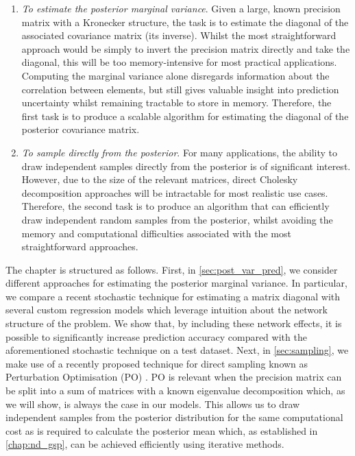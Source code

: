 \begin{enumerate}
    
    \item \textit{To estimate the posterior marginal variance}. Given a large, known precision matrix with a Kronecker structure, the task is to estimate the diagonal of the associated covariance matrix (its inverse). Whilst the most straightforward approach would be simply to invert the precision matrix directly and take the diagonal, this will be too memory-intensive for most practical applications. Computing the marginal variance alone disregards information about the correlation between elements, but still gives valuable insight into prediction uncertainty whilst remaining tractable to store in memory. Therefore, the first task is to produce a scalable algorithm for estimating the diagonal of the posterior covariance matrix. 
    \item \textit{To sample directly from the posterior}. For many applications, the ability to draw independent samples directly from the posterior is of significant interest. However, due to the size of the relevant matrices, direct Cholesky decomposition approaches will be intractable for most realistic use cases. Therefore, the second task is to produce an algorithm that can efficiently draw independent random samples from the posterior, whilst avoiding the memory and computational difficulties associated with the most straightforward approaches. 
\end{enumerate}

The chapter is structured as follows. First, in \cref{sec:post_var_pred}, we consider different approaches for estimating the posterior marginal variance. In particular, we compare a recent stochastic technique for estimating a matrix diagonal \citep{Bekas2007, Tang2012} with several custom regression models which leverage intuition about the network structure of the problem. We show that, by including these network effects, it is possible to significantly increase prediction accuracy compared with the aforementioned stochastic technique on a test dataset. Next, in \cref{sec:sampling}, we make use of a recently proposed technique for direct sampling known as Perturbation Optimisation (PO) \citep{Vono2022}. PO is relevant when the precision matrix can be split into a sum of matrices with a known eigenvalue decomposition which, as we will show, is always the case in our models. This allows us to draw independent samples from the posterior distribution for the same computational cost as is required to calculate the posterior mean which, as established in \cref{chap:nd_gsp}, can be achieved efficiently using iterative methods. 

